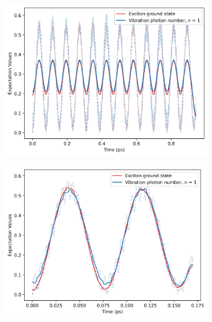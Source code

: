 \documentclass[12pt]{article}
\begin{document}
\begin{figure}[H]
    \centering
    \begin{subfigure}{0.49\textwidth}
        \centering
        \includegraphics[width=\linewidth]{Research Project/Code/results/ExVib/Closed/Envelope/pops_ground.png}
        \caption{}
        \label{fig:EVM_CQS_Pop_env}
    \end{subfigure}
    \hfill
    \begin{subfigure}{0.49\textwidth}
        \centering
        \includegraphics[width=\linewidth]{Research Project/Code/results/ExVib/Closed/Fast/pops_ground.png}
        \caption{}
        \label{fig:EVM_CQS_Pop_fast}
    \end{subfigure}
    
    \caption{}
    \label{fig:EVM_CQS_Pops}
\end{figure}
\end{document}

